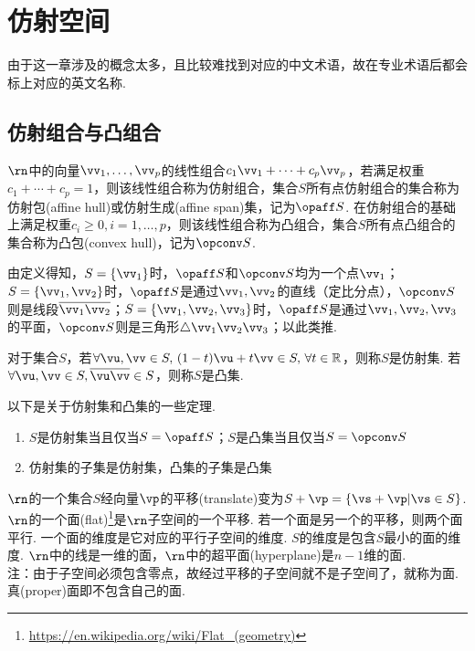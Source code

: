 
\section{仿射空间}
由于这一章涉及的概念太多，且比较难找到对应的中文术语，故在专业术语后都会标上对应的英文名称.
\subsection{仿射组合与凸组合}
\begin{definition}[仿射组合与凸组合]\rm
$\rn$中的向量$\vv_1,\dots,\vv_p$的线性组合$c_1\vv_1+\cdots+c_p\vv_p$，若满足权重$c_1+\cdots+c_p=1$，则该线性组合称为仿射组合，集合$S$所有点仿射组合的集合称为仿射包(affine hull)或仿射生成(affine span)集，记为$\opaff S$. 在仿射组合的基础上满足权重$c_i\geq 0,i=1,\dots,p$，则该线性组合称为凸组合，集合$S$所有点凸组合的集合称为凸包(convex hull)，记为$\opconv S$.
\end{definition}
由定义得知，$S=\{\vv_1\}$时，$\opaff S$和$\opconv S$均为一个点$\vv_1$；$S=\{\vv_1,\vv_2\}$时，$\opaff S$是通过$\vv_1,\vv_2$的直线（定比分点），$\opconv S$则是线段$\overline{\vv_1\vv_2}$；$S=\{\vv_1,\vv_2,\vv_3\}$时，$\opaff S$是通过$\vv_1,\vv_2,\vv_3$的平面，$\opconv S$则是三角形$\triangle\vv_1\vv_2\vv_3$；以此类推.
\begin{definition}
对于集合$S$，若$\forall\vu,\vv\in S,\,(1-t)\vu+t\vv\in S,\,\forall t\in\mathbb{R}$，则称$S$是仿射集. 若$\forall\vu,\vv\in S,\overline{\vu\vv}\in S$，则称$S$是凸集.
\end{definition}
\begin{theorem}以下是关于仿射集和凸集的一些定理.
\begin{enumerate}
	\itemsep -3pt
	\item $S$是仿射集当且仅当$S=\opaff S$；$S$是凸集当且仅当$S=\opconv S$
	\item 仿射集的子集是仿射集，凸集的子集是凸集
\end{enumerate}
\end{theorem}
\begin{definition}
\rm$\rn$的一个集合$S$经向量$\vp$的平移(translate)变为$S+\vp=\{\vs+\vp|\vs\in S\}$. $\rn$的一个面(flat)\footnote{\url{https://en.wikipedia.org/wiki/Flat_(geometry)}}是$\rn$子空间的一个平移. 若一个面是另一个的平移，则两个面平行. 一个面的维度是它对应的平行子空间的维度. $S$的维度是包含$S$最小的面的维度. $\rn$中的线是一维的面，$\rn$中的超平面(hyperplane)是$n-1$维的面.\\
注：由于子空间必须包含零点，故经过平移的子空间就不是子空间了，就称为面. 真(proper)面即不包含自己的面.
\end{definition}
